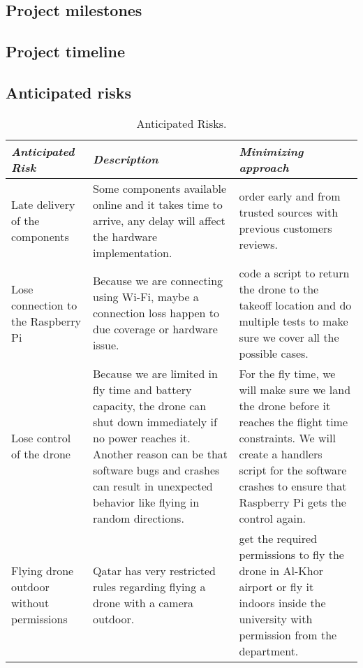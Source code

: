 \documentclass[../main.tex]{subfiles}
\begin{document}
\subsection{Project milestones}

\lipsum[1]

\subsection{Project timeline}



\subsection{Anticipated risks}

\begin{table}[H]
	\centering
	\caption{Anticipated Risks.}
	\label{tab:Anticipated Risks}
        \begin{tabularx}{\textwidth}{ X X X }
		\toprule
		\textit{Anticipated Risk} 
		& \textit{Description} 
		& \textit{Minimizing approach} \\
		
		\midrule
		
		Late delivery of the components 
		& Some components available online 
		and it takes time to arrive, 
		any delay will affect the hardware implementation.
		& order early and from trusted sources with previous 
		customers reviews. \\
		
		Lose connection to the Raspberry Pi
		& Because we are connecting using Wi-Fi, maybe a connection loss 
		happen to due coverage or hardware issue.
		& code a script to return the drone to the takeoff location 
		and do multiple tests to make sure we cover all the possible cases. \\
		
		Lose control of the drone
		& Because we are limited in fly time and battery capacity, 
		the drone can shut down immediately if no power reaches it.
		Another reason can be that software bugs and crashes can 
		result in unexpected behavior like flying in random directions.
		& For the fly time, we will make sure we land the drone before it reaches the flight time constraints.
		We will create a handlers script for the software crashes 
		to ensure that Raspberry Pi gets the control again.  \\
		
		Flying drone outdoor without permissions 
		& Qatar has very restricted rules regarding flying a drone 
		with a camera outdoor.
		& get the required permissions to fly the drone in 
		Al-Khor airport or fly it indoors inside the university with permission from the department. \\
		
		\bottomrule		
	\end{tabularx}
\end{table}
\end{document}
